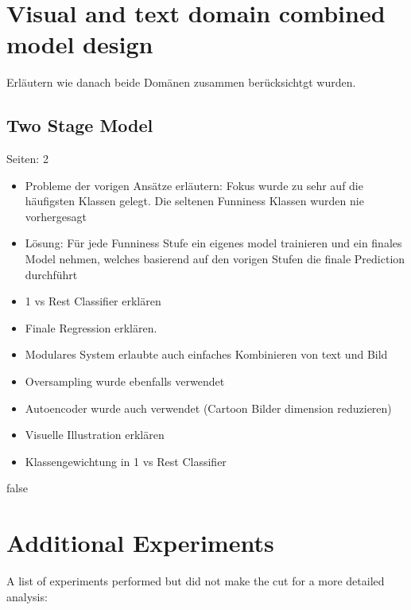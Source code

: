 \documentclass[draft,final,oneside]{vutinfth} %
\begin{document}
\section{Visual and text domain combined model design}

Erläutern wie danach beide Domänen zusammen berücksichtgt wurden.

\subsection{Two Stage Model}

Seiten: 2

\begin{itemize}

\item Probleme der vorigen Ansätze erläutern: Fokus wurde zu sehr auf die häufigsten Klassen gelegt. Die seltenen Funniness Klassen wurden nie vorhergesagt
\item Lösung: Für jede Funniness Stufe ein eigenes model trainieren und ein finales Model nehmen, welches basierend auf den vorigen Stufen die finale Prediction durchführt
\item 1 vs Rest Classifier erklären
\item Finale Regression erklären.
\item Modulares System erlaubte auch einfaches Kombinieren von text und Bild
\item Oversampling wurde ebenfalls verwendet
\item Autoencoder wurde auch verwendet (Cartoon Bilder dimension reduzieren)
\item Visuelle Illustration erklären
\item Klassengewichtung in 1 vs Rest Classifier

\end{itemize}

\if false
\section{Additional Experiments}
A list of experiments performed but did not make the cut for a more detailed analysis:
\end{document}
